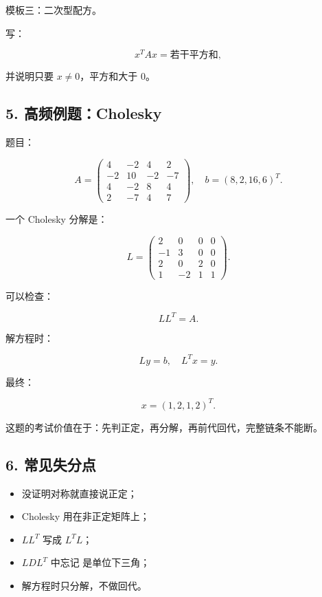\documentclass[11pt,a4paper]{ctexart}
\newcommand{\code}[1]{\begingroup\ttfamily\small #1\endgroup}
\begin{document}
模板三：二次型配方。

写：

\[
x^TAx=\text{若干平方和},
\]

并说明只要 $x\ne 0$，平方和大于 0。


\subsection*{5. 高频例题：Cholesky}


题目：

\[
A=\begin{pmatrix}
4&-2&4&2\\
-2&10&-2&-7\\
4&-2&8&4\\
2&-7&4&7
\end{pmatrix},\quad b=(8,2,16,6)^T.
\]

一个 Cholesky 分解是：

\[
L=\begin{pmatrix}
2&0&0&0\\
-1&3&0&0\\
2&0&2&0\\
1&-2&1&1
\end{pmatrix}.
\]

可以检查：

\[
LL^T=A.
\]

解方程时：

\[
Ly=b,\quad L^Tx=y.
\]

最终：

\[
x=(1,2,1,2)^T.
\]

这题的考试价值在于：先判正定，再分解，再前代回代，完整链条不能断。


\subsection*{6. 常见失分点}


\begin{itemize}

\item 没证明对称就直接说正定；

\item Cholesky 用在非正定矩阵上；

\item $LL^T$ 写成 $L^TL$；

\item $LDL^T$ 中忘记 \code{} 是单位下三角；

\item 解方程时只分解，不做回代。

\end{itemize}
\end{document}
